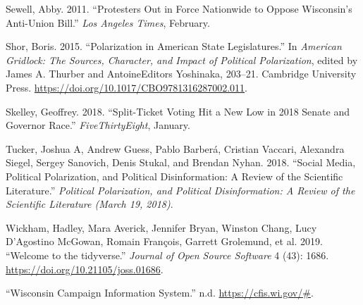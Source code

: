 \documentclass[12pt,]{article}
\begin{document}
\leavevmode\hypertarget{ref-sewell2011}{}%
Sewell, Abby. 2011. ``Protesters Out in Force Nationwide to Oppose
Wisconsin's Anti-Union Bill.'' \emph{Los Angeles Times}, February.

\leavevmode\hypertarget{ref-shor2015}{}%
Shor, Boris. 2015. ``Polarization in American State Legislatures.'' In
\emph{American Gridlock: The Sources, Character, and Impact of Political
Polarization}, edited by James A. Thurber and AntoineEditors Yoshinaka,
203--21. Cambridge University Press.
\url{https://doi.org/10.1017/CBO9781316287002.011}.

\leavevmode\hypertarget{ref-skelley2018}{}%
Skelley, Geoffrey. 2018. ``Split-Ticket Voting Hit a New Low in 2018
Senate and Governor Race.'' \emph{FiveThirtyEight}, January.

\leavevmode\hypertarget{ref-tucker2018}{}%
Tucker, Joshua A, Andrew Guess, Pablo Barberá, Cristian Vaccari,
Alexandra Siegel, Sergey Sanovich, Denis Stukal, and Brendan Nyhan.
2018. ``Social Media, Political Polarization, and Political
Disinformation: A Review of the Scientific Literature.'' \emph{Political
Polarization, and Political Disinformation: A Review of the Scientific
Literature (March 19, 2018)}.

\leavevmode\hypertarget{ref-tidyverse}{}%
Wickham, Hadley, Mara Averick, Jennifer Bryan, Winston Chang, Lucy
D'Agostino McGowan, Romain François, Garrett Grolemund, et al. 2019.
``Welcome to the tidyverse.'' \emph{Journal of Open Source Software} 4
(43): 1686. \url{https://doi.org/10.21105/joss.01686}.

\leavevmode\hypertarget{ref-cfis}{}%
``Wisconsin Campaign Information System.'' n.d.
\url{https://cfis.wi.gov/\#}.





\newpage
\singlespacing 
\end{document}
